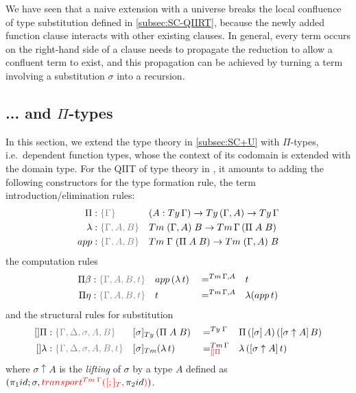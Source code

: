\documentclass[a4paper,UKenglish,numberwithinsect,cleveref,thm-restate]{lipics-v2021}
\begin{document}
\begin{remark}
We have seen that a naive extension with a universe breaks the local confluence of type substitution defined in \cref{subsec:SC-QIIRT}, because the newly added function clause interacts with other existing clauses.
In general, every term occurs on the right-hand side of a clause needs to propagate the reduction to allow a confluent term to exist, and this propagation can be achieved by turning a term involving a substitution $\sigma$ into a recursion.
\end{remark}

\subsection{... and \texorpdfstring{$\Pi$}{Π}-types} \label{subsec:SC+U+Pi}

In this section, we extend the type theory in \cref{subsec:SC+U} with $\Pi$-types, i.e.\ dependent function types, whose the context of its codomain is extended with the domain type.
For the QIIT of type theory in \cite{Altenkirch2016a}, it amounts to adding the following constructors for the type formation rule, the term introduction/elimination rules:
\begin{alignat*}{3}
  \Pi     &: \implicit{\Gamma}            && (A : \Ty\,\Gamma) \to \Ty\,(\Gamma, A) \to \Ty\,\Gamma \\
  \lambda &: \implicit{\Gamma, A, B}      && \Tm\;(\Gamma, A)\;B \to \Tm\,\Gamma\,(\Pi\;A\;B) \\
  \mathsf{app} &: \implicit{\Gamma, A, B} && \Tm\;\Gamma\;(\Pi\;A\;B) \to \Tm\;(\Gamma, A)\;B
\end{alignat*}
the computation rules
\begin{alignat*}{5}
  \Pi\beta           & : \implicit{\Gamma, A, B, t} && \mathsf{app}\,(\lambda\,t) && =^{\Tm\,\Gamma,A} && t \\
  \Pi\eta            & : \implicit{\Gamma, A, B, t} && t                        && =^{\Tm\,\Gamma,A} && \lambda(\mathsf{app}\,t)
\end{alignat*}
and the structural rules for substitution
\begin{alignat}{5}
  []\Pi              & : \implicit{\Gamma, \Delta, \sigma, A, B}    && [ \sigma ]_{\Ty}\,(\Pi\;A\;B) && =^{\Ty\;\Gamma} && \Pi\,(\sub{\sigma}{A})\,([\sigma\uparrow A]\,B) \label{eq:def-type-subst-8} \\
  \mathsf{[]\lambda} & : \implicit{\Gamma, \Delta, \sigma, A, B, t} && [\sigma]_{\Tm} (\lambda\,t) && =^{\Tm\,\Gamma}_{\alert{[]\Pi}} && \lambda\,([\sigma \uparrow A]\,t) \nonumber
\end{alignat}
where $\sigma \uparrow A$ is the \emph{lifting}  of $\sigma$ by a type $A$ defined as $(\pi_1\idS; \sigma, \alert{\transfib{\Tm\;\Gamma}{[;]_T}{\color{black}\pi_2\idS}})$. 
\end{document}
